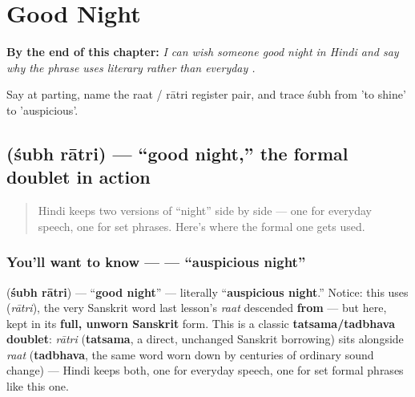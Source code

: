 
\chapter{Good Night}
\label{ch:hi-good-night}

\begin{chapteropening}
\textbf{By the end of this chapter:} \emph{I can wish someone good night in Hindi and say why the phrase uses literary  rather than everyday .}

Say   at parting, name the raat / rātri register pair, and trace śubh from 'to shine' to 'auspicious'.
\end{chapteropening}

\section[\texorpdfstring{\hi{शुभ} \hi{रात्रि} (śubh rātri)}{शुभ रात्रि (śubh rātri)}]{  (śubh rātri) — \textquotedblleft{}good night,\textquotedblright{} the formal doublet in action}

\label{lesson:HI-C27-shubh-raatri}



\begin{quote}
Hindi keeps two versions of \textquotedblleft{}night\textquotedblright{} side by side — one for everyday speech, one for set phrases. Here's where the formal one gets used.
\end{quote}

\subsection*{You'll want to know —   — \textquotedblleft{}auspicious night\textquotedblright{}}
\textbf{ } (\textbf{śubh rātri}) — \textquotedblleft{}\textbf{good night}\textquotedblright{} — literally \textquotedblleft{}\textbf{auspicious night}.\textquotedblright{} Notice: this uses \textbf{} (\emph{rātri}), the very Sanskrit word last lesson's \emph{raat} descended \textbf{from} — but here, kept in its \textbf{full, unworn Sanskrit} form. This is a classic \textbf{tatsama/tadbhava doublet}: \emph{rātri} (\textbf{tatsama}, a direct, unchanged Sanskrit borrowing) sits alongside \emph{raat} (\textbf{tadbhava}, the same word worn down by centuries of ordinary sound change) — Hindi keeps both, one for everyday speech, one for set formal phrases like this one.


